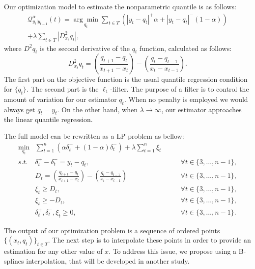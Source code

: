 Our optimization model to estimate the nonparametric quantile is as follows:
\begin{equation}
\begin{split}
\mathcal{Q}_{y_t|y_{t-1}}^\alpha(t) =\underset{q_{t}}{\arg\min}\sum_{t\in T}\left(|y_{t}-q_{t}|^{+}\alpha + |y_{t}-q_{t}|^{-}(1-\alpha)\right) \\ +\lambda  \sum_{t\in T}|D_{x_t}^{2}q_{t}|,
\end{split}
\end{equation}
where $D^2 q_t$ is the second derivative of the $q_t$ function, calculated as follows:
\begin{equation*}
D_{x_t}^{2}q_{t}=\left(\frac{q_{t+1}-q_{t}}{x_{t+1}-x_{t}}\right)-\left(\frac{q_t-q_{t-1}}{x_{t}-x_{t-1}}\right).
\end{equation*}
The first part on the objective function is the usual quantile regression condition for $\{q_t\}$. The second part is the $\ell_1$-filter. The purpose of a filter is to control the amount of variation for our estimator $q_t$. When no penalty is employed we would always get $q_t = y_t$. On the other hand, when $\lambda \rightarrow \infty$, our estimator approaches the linear quantile regression. 

The full model can be rewritten as a LP problem as bellow:
\begin{eqnarray}
\min_{q_{t}} & \sum_{t=1}^{n}\left(\alpha\delta_{t}^{+}+(1-\alpha)\delta_{t}^{-}\right)+\lambda\sum_{t=1}^{n}\xi_{t}\\
s.t. & \delta_{t}^{+}-\delta_{t}^{-}=y_{t}-q_{t}, & \qquad\forall t\in\{3,\dots,n-1\},\\
 & D_{t}=\left(\frac{q_{t+1}-q_{t}}{x_{t+1}-x_{t}}\right)-\left(\frac{q_{t}-q_{t-1}}{x_{t}-x_{t-1}}\right) & \qquad\forall t\in\{3,\dots,n-1\},\\
 & \xi_{t}\geq D_{t}, & \qquad\forall t\in\{3,\dots,n-1\},\\
 & \xi_{t}\geq-D_{t}, & \qquad\forall t\in\{3,\dots,n-1\},\\
 & \delta_{t}^{+},\delta_{t}^{-},\xi_{t}\geq0, & \qquad\forall t\in\{3,\dots,n-1\}.
\end{eqnarray}

The output of our optimization problem is a sequence of ordered points $\{(x_t, q_t)\}_{t \in T}$. The next step is to interpolate these points in order to provide an estimation for any other value of $x$. To address this issue, we propose using a B-splines interpolation, that will be developed in another study.

